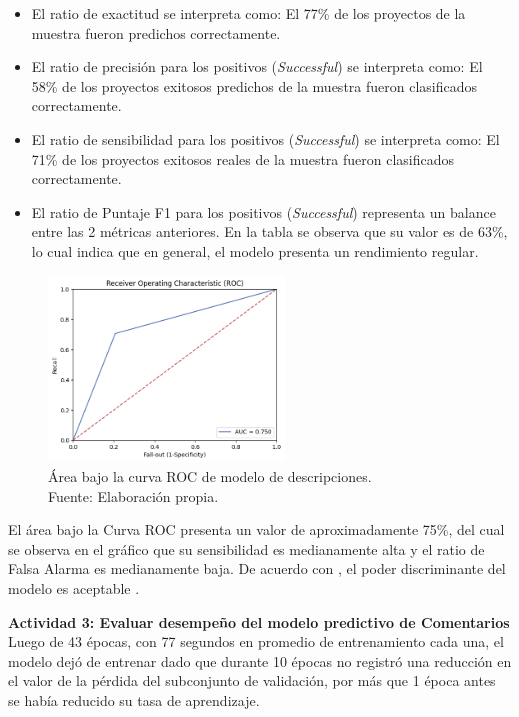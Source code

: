 \begin{itemize}
	\item El ratio de exactitud se interpreta como: El 77\% de los proyectos de la muestra fueron predichos correctamente.
	\item El ratio de precisión para los positivos (\textit{Successful}) se interpreta como: El 58\% de los proyectos exitosos predichos de la muestra fueron clasificados correctamente. 
	\item El ratio de sensibilidad para los positivos (\textit{Successful}) se interpreta como: El 71\% de los proyectos exitosos reales de la muestra fueron clasificados correctamente.
	\item El ratio de Puntaje F1 para los positivos (\textit{Successful}) representa un balance entre las 2 métricas anteriores. En la tabla se observa que su valor es de 63\%, lo cual indica que en general, el modelo presenta un rendimiento regular.
\end{itemize}

\begin{figure}[!ht]
	\begin{center}
		\includegraphics[width=0.56\textwidth]{5/figures/description_auc.png}
		\caption[Área bajo la curva ROC de modelo de descripciones]{Área bajo la curva ROC de modelo de descripciones.\\
		Fuente: Elaboración propia.}
		\label{5:fig6}
	\end{center}
\end{figure}

El área bajo la Curva ROC presenta un valor de aproximadamente 75\%, del cual se observa en el gráfico que su sensibilidad es medianamente alta y el ratio de Falsa Alarma es medianamente baja. De acuerdo con \cite{bk_britos2006datamining}, el poder discriminante del modelo es aceptable .

\newpage
\textbf{Actividad 3: Evaluar desempeño del modelo predictivo de Comentarios}
\\
Luego de 43 épocas, con 77 segundos en promedio de entrenamiento cada una, el modelo dejó de entrenar dado que durante 10 épocas no registró una reducción en el valor de la pérdida del subconjunto de validación, por más que 1 época antes se había reducido su tasa de aprendizaje.

